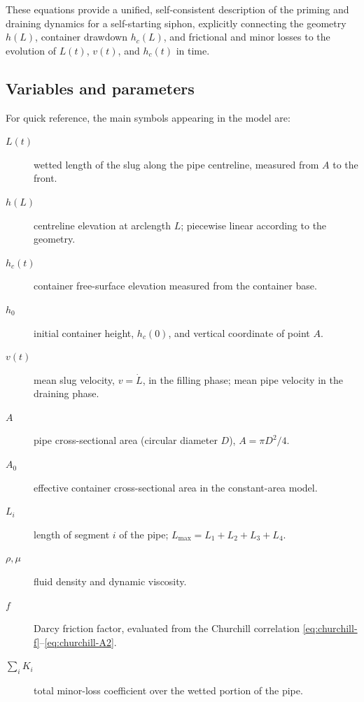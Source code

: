 \documentclass[11pt]{article}
\begin{document}
These equations provide a unified, self-consistent description of the priming and draining
dynamics for a self-starting siphon, explicitly connecting the geometry $h(L)$, container
drawdown $h_c(L)$, and frictional and minor losses to the evolution of $L(t)$, $v(t)$, and
$h_c(t)$ in time.

\subsection*{Variables and parameters}
For quick reference, the main symbols appearing in the model are:
\begin{description}
  \item[$L(t)$] wetted length of the slug along the pipe centreline, measured from $A$ to the front.
  \item[$h(L)$] centreline elevation at arclength $L$; piecewise linear according to the geometry.
  \item[$h_c(t)$] container free-surface elevation measured from the container base.
  \item[$h_0$] initial container height, $h_c(0)$, and vertical coordinate of point $A$.
  \item[$v(t)$] mean slug velocity, $v=\dot L$, in the filling phase; mean pipe velocity in the draining phase.
  \item[$A$] pipe cross-sectional area (circular diameter $D$), $A=\pi D^2/4$.
  \item[$A_0$] effective container cross-sectional area in the constant-area model.
  \item[$L_i$] length of segment $i$ of the pipe; $L_{\max}=L_1+L_2+L_3+L_4$.
  \item[$\rho,\mu$] fluid density and dynamic viscosity.
  \item[$f$] Darcy friction factor, evaluated from the Churchill correlation \eqref{eq:churchill-f}--\eqref{eq:churchill-A2}.
  \item[$\sum_i K_i$] total minor-loss coefficient over the wetted portion of the pipe.
\end{description}
\end{document}
